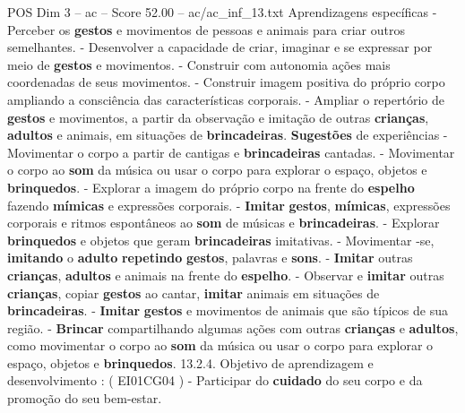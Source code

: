 \begin{textsample}{POS Dim 3 – ac – Score 52.00 – ac/ac\_inf\_13.txt}
Aprendizagens específicas - Perceber os \textbf{gestos} e movimentos de pessoas e animais para criar outros semelhantes. - Desenvolver a capacidade de criar, imaginar e se expressar por meio de \textbf{gestos} e movimentos. - Construir com autonomia ações mais coordenadas de seus movimentos. - Construir imagem positiva do próprio corpo ampliando a consciência das características corporais. - Ampliar o repertório de \textbf{gestos} e movimentos, a partir da observação e imitação de outras \textbf{crianças}, \textbf{adultos} e animais, em situações de \textbf{brincadeiras}. \textbf{Sugestões} de experiências - Movimentar o corpo a partir de cantigas e \textbf{brincadeiras} cantadas. - Movimentar o corpo ao \textbf{som} da música ou usar o corpo para explorar o espaço, objetos e \textbf{brinquedos}. - Explorar a imagem do próprio corpo na frente do \textbf{espelho} fazendo \textbf{mímicas} e expressões corporais. - \textbf{Imitar} \textbf{gestos}, \textbf{mímicas}, expressões corporais e ritmos espontâneos ao \textbf{som} de músicas e \textbf{brincadeiras}. - Explorar \textbf{brinquedos} e objetos que geram \textbf{brincadeiras} imitativas. - Movimentar -se, \textbf{imitando} o \textbf{adulto} \textbf{repetindo} \textbf{gestos}, palavras e \textbf{sons}. - \textbf{Imitar} outras \textbf{crianças}, \textbf{adultos} e animais na frente do \textbf{espelho}. - Observar e \textbf{imitar} outras \textbf{crianças}, copiar \textbf{gestos} ao cantar, \textbf{imitar} animais em situações de \textbf{brincadeiras}. - \textbf{Imitar} \textbf{gestos} e movimentos de animais que são típicos de sua região. - \textbf{Brincar} compartilhando algumas ações com outras \textbf{crianças} e \textbf{adultos}, como movimentar o corpo ao \textbf{som} da música ou usar o corpo para explorar o espaço, objetos e \textbf{brinquedos}. 13.2.4.
Objetivo de aprendizagem e desenvolvimento : ( EI01CG04 ) - Participar do \textbf{cuidado} do seu corpo e da promoção do seu bem-estar.

\end{textsample}
